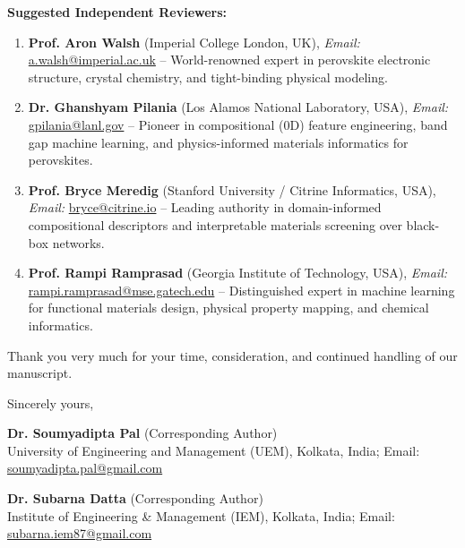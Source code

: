 \documentclass[11pt,a4paper]{article}
\begin{document}
\textbf{Suggested Independent Reviewers:}
\begin{enumerate}
    \item \textbf{Prof. Aron Walsh} (Imperial College London, UK), \textit{Email:} \url{a.walsh@imperial.ac.uk} -- World-renowned expert in perovskite electronic structure, crystal chemistry, and tight-binding physical modeling.
    \item \textbf{Dr. Ghanshyam Pilania} (Los Alamos National Laboratory, USA), \textit{Email:} \url{gpilania@lanl.gov} -- Pioneer in compositional (0D) feature engineering, band gap machine learning, and physics-informed materials informatics for perovskites.
    \item \textbf{Prof. Bryce Meredig} (Stanford University / Citrine Informatics, USA), \textit{Email:} \url{bryce@citrine.io} -- Leading authority in domain-informed compositional descriptors and interpretable materials screening over black-box networks.
    \item \textbf{Prof. Rampi Ramprasad} (Georgia Institute of Technology, USA), \textit{Email:} \url{rampi.ramprasad@mse.gatech.edu} -- Distinguished expert in machine learning for functional materials design, physical property mapping, and chemical informatics.
\end{enumerate}

Thank you very much for your time, consideration, and continued handling of our manuscript.

\bigskip

Sincerely yours,

\textbf{Dr. Soumyadipta Pal} (Corresponding Author) \\
University of Engineering and Management (UEM), Kolkata, India; Email: \url{soumyadipta.pal@gmail.com}

\textbf{Dr. Subarna Datta} (Corresponding Author) \\
Institute of Engineering \& Management (IEM), Kolkata, India; Email: \url{subarna.iem87@gmail.com}
\end{document}
